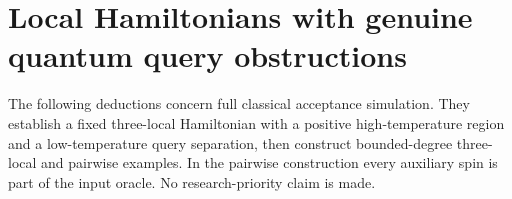 \section{Local Hamiltonians with genuine quantum query obstructions}
\label{res:obstructions}

The following deductions concern full classical acceptance simulation.
They establish a fixed three-local Hamiltonian with a positive
high-temperature region and a low-temperature query separation, then
construct bounded-degree three-local and pairwise examples.  In the
pairwise construction every auxiliary spin is part of the input oracle.
No research-priority claim is made.







